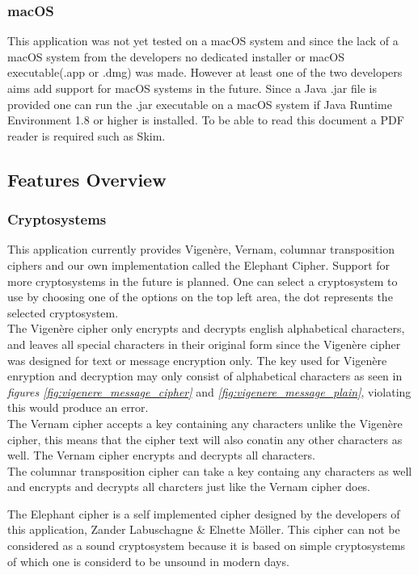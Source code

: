 \documentclass[11pt]{article}
\begin{document}
	\subsubsection{macOS}
	This application was not yet tested on a macOS system and since the lack of a macOS system from the developers no dedicated installer or macOS executable(.app or .dmg) was made. However at least one of the two developers aims add support for macOS systems in the future. Since a Java .jar file is provided one can run the .jar executable on a macOS system if Java Runtime Environment 1.8 or higher is installed. To be able to read this document a PDF reader is required such as Skim.

	\subsection{Features Overview}
	\subsubsection{Cryptosystems}
	This application currently provides Vigen\`ere, Vernam, columnar transposition ciphers and our own implementation called the Elephant Cipher. Support for more cryptosystems in the future is planned. One can select a cryptosystem to use by choosing one of the options on the top left area, the dot represents the selected cryptosystem.\\

	The Vigen\`ere cipher only encrypts and decrypts english alphabetical characters, and leaves all special characters in their original form since the Vigen\`ere cipher was designed for text or message encryption only. The key used for Vigen\`ere enryption and decryption may only consist of alphabetical characters as seen in \textit{figures \ref{fig:vigenere_message_cipher}} and \textit{\ref{fig:vigenere_message_plain}}, violating this would produce an error.\\

	The Vernam cipher accepts a key containing any characters unlike the Vigen\`ere cipher, this means that the cipher text will also conatin any other characters as well. The Vernam cipher encrypts and decrypts all characters.\\

	The columnar transposition cipher can take a key containg any characters as well and encrypts and decrypts all charcters just like the Vernam cipher does.

	The Elephant cipher is a self implemented cipher designed by the developers of this application, Zander Labuschagne \& Elnette M\"oller. This cipher can not be considered as a sound cryptosystem because it is based on simple cryptosystems of which one is considerd to be unsound in modern days.
\end{document}
